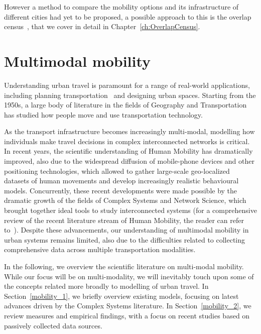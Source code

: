 However a method to compare the mobility options and its infrastructure of different cities had yet to be proposed, a possible approach to this is the overlap census~\cite{natera2020multimodal}, that we cover in detail in Chapter~\ref{ch:OverlapCensus}.


\section{Multimodal mobility}\label{sec:multimodalmobility}

Understanding urban travel is paramount for a range of real-world applications, including planning transportation~\cite{patriksson2015traffic} and designing urban spaces. Starting from the 1950s, a large body of literature in the fields of Geography and Transportation has studied how people move and use transportation technology. 

As the transport infrastructure becomes increasingly multi-modal, modelling how individuals make travel decisions in complex interconnected networks is critical. In recent years, the scientific understanding of Human Mobility has dramatically improved, also due to the widespread diffusion of mobile-phone devices and other positioning technologies, which allowed to gather large-scale geo-localized datasets of human movements and develop increasingly realistic behavioural models. Concurrently, these recent developments were made possible by the dramatic growth of the fields of Complex Systems and Network Science, which brought together ideal tools to study interconnected systems (for a comprehensive review of the recent literature stream of Human Mobility, the reader can refer to~\cite{barbosa2018human}). Despite these advancements, our understanding of multimodal mobility in urban systems remains limited, also due to the difficulties related to collecting comprehensive data across multiple transportation modalities. 

In the following, we overview the scientific literature on multi-modal mobility. While our focus will be on multi-modality, we will inevitably touch upon some of the concepts related more broadly to modelling of urban travel. In Section~\ref{mobility_1}, we briefly overview existing models, focusing on latest advances driven by the Complex Systems literature. In Section~\ref{mobility_2}, we review measures and empirical findings, with a focus on recent studies based on passively collected data sources. 

